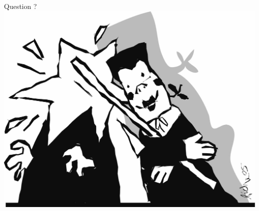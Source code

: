 \documentclass[xcolor=svgnames,12pt]{beamer}
\begin{document}
\begin{frame}{Question ?}
    \includegraphics[width=.7\paperwidth]{baton.jpg}
\end{frame}
\end{document}
